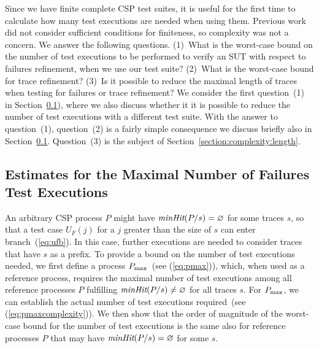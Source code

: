 Since we have finite complete CSP test suites, it is useful for the first
time to calculate how many test executions are needed when using them.
Previous work did not consider sufficient conditions for finiteness, so
complexity was not a concern. We answer the following questions. (1)~What is
the worst-case bound on the number of test executions to be performed to
verify an SUT with respect to failures refinement, when we use our test
suite? (2)~What is the worst-case bound for trace refinement? (3)~Is it
possible to reduce the maximal length of traces when testing for failures or
trace refinement? We consider the first question~(1) in
Section~\ref{section:complexity:failures}), where we also discuss whether it
it is possible to reduce the number of test executions with a different test
suite.  With the answer to question~(1), question~(2) is a fairly simple
consequence we discuss briefly also in
Section~\ref{section:complexity:failures}. Question~(3) is the subject of
Section~\ref{section:complexity:length}.

\subsection{Estimates for the Maximal Number of Failures Test Executions}
\label{section:complexity:failures}

An arbitrary CSP process $P$ might have $\text{\it minHit}(P/s) = \varnothing$ for
some traces $s$, so that a test case $U_F(j)$ for a $j$ greater than the size
of $s$ can enter branch~(\ref{eq:ufb}). In this case, further executions are
needed to consider traces that have $s$ as a prefix.  To provide a bound on
the number of test executions needed, we first define a process $P_\text{max}$~(see
(\ref{eq:pmax})), which, when used as a reference process, requires the
maximal number of test executions among all reference processes $P$
fulfilling $\text{\it minHit}(P/s) \neq \varnothing$ for all traces $s$. For $P_\text{max}$,
we can establish the actual number of test executions required~(see
(\ref{eq:pmaxcomplexity})). We then show that the order of magnitude of the
worst-case bound for the number of test executions is the same also for
reference processes $P$ that may have $\text{\it minHit}(P/s) = \varnothing$ for some
$s$.

